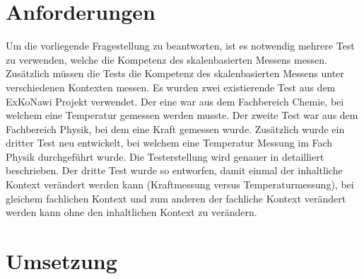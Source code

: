 
\section{Anforderungen}

Um die vorliegende Fragestellung zu beantworten, ist es notwendig mehrere Test zu verwenden, welche die Kompetenz des skalenbasierten Messens messen. Zusätzlich müssen die Tests die Kompetenz des skalenbasierten Messens unter verschiedenen Kontexten messen. Es wurden zwei existierende Test aus dem ExKoNawi Projekt verwendet. Der eine war aus dem Fachbereich Chemie, bei welchem eine Temperatur gemessen werden musste. Der zweite Test war aus dem Fachbereich Physik, bei dem eine Kraft gemessen wurde. Zusätzlich wurde ein dritter Test neu entwickelt, bei welchem eine Temperatur Messung im Fach Physik durchgeführt wurde. Die Testerstellung wird genauer in \citet{Sichau2015} detailliert beschrieben. Der dritte Test wurde so entworfen, damit einmal der inhaltliche Kontext verändert werden kann (Kraftmessung versus Temperaturmessung), bei gleichem fachlichen Kontext und zum anderen der fachliche Kontext verändert werden kann ohne den inhaltlichen Kontext zu verändern. 


\section{Umsetzung}

